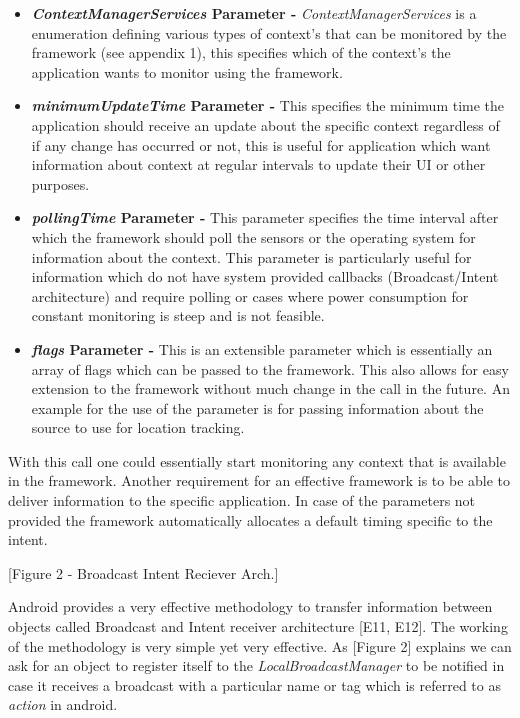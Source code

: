 \documentclass[12pt]{report}
\begin{document}
\begin{itemize}
\item \textbf{\textit{ContextManagerServices} Parameter - } \textit{ContextManagerServices} is a enumeration defining various types of context's that can be monitored by the framework (see appendix 1), this specifies which of the context's the application wants to monitor using the framework.
\item \textbf{\textit{minimumUpdateTime} Parameter - } This specifies the minimum time the application should receive an update about the specific context regardless of if any change has occurred or not, this is useful for application which want information about context at regular intervals to update their UI or other purposes.

\item \textbf{\textit{pollingTime} Parameter - } This parameter specifies the time interval after which the framework should poll the sensors or the operating system for information about the context. This parameter is particularly useful for information which do not have system provided callbacks (Broadcast/Intent architecture) and require polling or cases where power consumption for constant monitoring is steep and is not feasible.

\item \textbf{\textit{flags} Parameter - } This is an extensible parameter which is essentially an array of flags which can be passed to the framework. This also allows for easy extension to the framework without much change in the call in the future. An example for the use of the parameter is for passing information about the source to use for location tracking.

\end{itemize}

With this call one could essentially start monitoring any context that is available in the framework. Another requirement for an effective framework is to be able to deliver information to the specific application. In case of the parameters not provided the framework automatically allocates a default timing specific to the intent.

[Figure 2 - Broadcast Intent Reciever Arch.]

Android provides a very effective methodology to transfer information between objects called Broadcast and Intent receiver architecture [E11, E12]. The working of the methodology is very simple yet very effective. As [Figure 2] explains we can ask for an object to register itself to the \textit{LocalBroadcastManager} to be notified in case it receives a broadcast with a particular name or tag which is referred to as \textit{action} in android.
\end{document}
